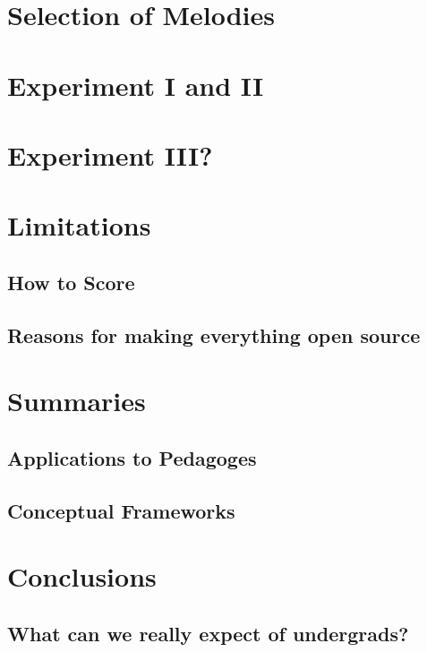 \documentclass[]{book}
\theoremstyle{definition}
\theoremstyle{definition}
\theoremstyle{definition}
\theoremstyle{remark}
\begin{document}
\hypertarget{selection-of-melodies}{%
\section{Selection of Melodies}\label{selection-of-melodies}}

\hypertarget{experiment-i-and-ii}{%
\section{Experiment I and II}\label{experiment-i-and-ii}}

\hypertarget{experiment-iii}{%
\section{Experiment III?}\label{experiment-iii}}

\hypertarget{limitations-1}{%
\section{Limitations}\label{limitations-1}}

\hypertarget{how-to-score}{%
\subsection{How to Score}\label{how-to-score}}

\hypertarget{reasons-for-making-everything-open-source}{%
\subsection{Reasons for making everything open
source}\label{reasons-for-making-everything-open-source}}

\hypertarget{summaries}{%
\section{Summaries}\label{summaries}}

\hypertarget{applications-to-pedagoges}{%
\subsection{Applications to Pedagoges}\label{applications-to-pedagoges}}

\hypertarget{conceptual-frameworks}{%
\subsection{Conceptual Frameworks}\label{conceptual-frameworks}}

\hypertarget{conclusions}{%
\section{Conclusions}\label{conclusions}}

\hypertarget{what-can-we-really-expect-of-undergrads}{%
\subsection{What can we really expect of
undergrads?}\label{what-can-we-really-expect-of-undergrads}}


\end{document}
